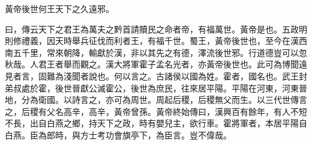 黃帝後世何王天下之久遠邪。

曰，傳云天下之君王為萬夫之黔首請贖民之命者帝，有福萬世。黃帝是也。五政明則修禮義，因天時舉兵征伐而利者王，有福千世。蜀王，黃帝後世也，至今在漢西南五千里，常來朝降，輸獻於漢，非以其先之有德，澤流後世邪。行道德豈可以忽秋哉。人君王者舉而觀之。漢大將軍霍子孟名光者，亦黃帝後世也。此可為博聞遠見者言，固難為淺聞者說也。何以言之。古諸侯以國為姓。霍者，國名也。武王封弟叔處於霍，後世晉獻公滅霍公，後世為庶民，往來居平陽。平陽在河東，河東晉地，分為衛國。以詩言之，亦可為周世。周起后稷，后稷無父而生。以三代世傳言之，后稷有父名高辛，高辛，黃帝曾孫。黃帝終始傳曰，漢興百有餘年，有人不短不長，出自白燕之鄉，持天下之政，時有嬰兒主，欲行車。霍將軍者，本居平陽自白燕。臣為郎時，與方士考功會旗亭下，為臣言。豈不偉哉。